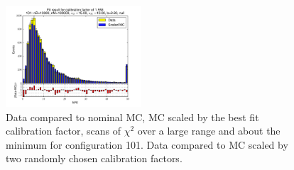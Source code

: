\begin{figure}[htbp]
\begin{center}
\includegraphics[width=0.45\textwidth]{../FIGURES/101/FIG_Fit_result_for_calibration_factor_of_1_558.pdf} 
\caption{Data compared to nominal MC, MC scaled by the best fit calibration factor, scans of $\chi^2$ over a large range and about the minimum for configuration 101. Data compared to MC scaled by two randomly chosen calibration factors.} 
\label{tab:best_101} 
\end{center} \end{figure} 

